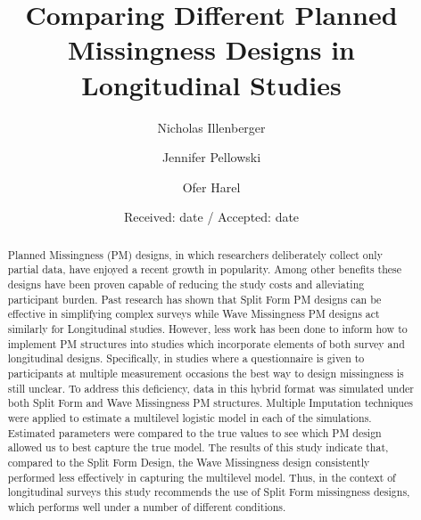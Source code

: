 \documentclass{svjour3}                     %
\begin{document}
\title{Comparing Different Planned Missingness Designs in Longitudinal Studies}

\author{Nicholas Illenberger \and Jennifer Pellowski \and Ofer Harel}


\date{Received: date / Accepted: date}


\maketitle

\begin{abstract}
Planned Missingness (PM) designs, in which researchers deliberately collect only partial data, have enjoyed a recent growth in popularity. Among other benefits these designs have been proven capable of reducing the study costs and alleviating participant burden. Past research has shown that Split Form PM designs can be effective in simplifying complex surveys while Wave Missingness PM designs act similarly for Longitudinal studies. However, less work has been done to inform how to implement PM structures into studies which incorporate elements of both survey and longitudinal designs. Specifically, in studies where a questionnaire is given to participants at multiple measurement occasions the best way to design missingness is still unclear. To address this deficiency, data in this hybrid format was simulated under both Split Form and Wave Missingness PM structures. Multiple Imputation techniques were applied to estimate a multilevel logistic model in each of the simulations. Estimated parameters were compared to the true values to see which PM design allowed us to best capture the true model. The results of this study indicate that, compared to the Split Form Design, the Wave Missingness design consistently performed less effectively in capturing the multilevel model. Thus, in the context of longitudinal surveys this study recommends the use of Split Form missingness designs, which performs well under a number of different conditions.

\end{abstract}
\end{document}
